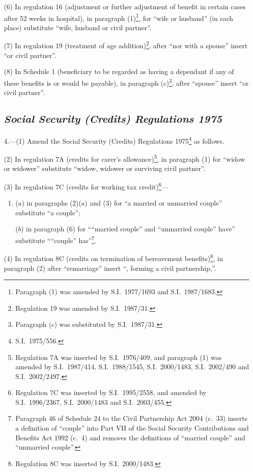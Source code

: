 \documentclass[12pt,a4paper]{article}
\begin{document}
(6) In regulation 16 (adjustment or further adjustment of benefit in certain cases after 52 weeks in hospital), in paragraph (1)\footnote{Paragraph (1) was amended by S.I.\ 1977/1693 and S.I.\ 1987/1683.}, for “wife or husband” (in each place) substitute “wife, husband or civil partner”.

(7) In regulation 19 (treatment of age addition)\footnote{Regulation 19 was amended by S.I.\ 1987/31.}, after “nor with a spouse” insert “or civil partner”.

(8) In Schedule 1 (beneficiary to be regarded as having a dependant if any of these benefits is or would be payable), in paragraph ($c$)\footnote{Paragraph ($c$) was substituted by S.I.\ 1987/31.}, after “spouse” insert “or civil partner”.

\subsection*{\itshape Social Security (Credits) Regulations 1975}

4.---(1)  Amend the Social Security (Credits) Regulations 1975\footnote{S.I.\ 1975/556.} as follows.

(2) In regulation 7A (credits for carer’s allowance)\footnote{Regulation 7A was inserted by S.I.\ 1976/409, and paragraph (1) was amended by S.I.\ 1987/414, S.I.\ 1988/1545, S.I.\ 2000/1483, S.I.\ 2002/490 and S.I.\ 2002/2497.}, in paragraph (1) for “widow or widower” substitute “widow, widower or surviving civil partner”.

(3) In regulation 7C (credits for working tax credit)\footnote{Regulation 7C was inserted by S.I.\ 1995/2558, and amended by S.I.\ 1996/2367, S.I.\ 2000/1483 and S.I.\ 2003/455.}—
\begin{enumerate}\item[]
($a$) in paragraphs (2)($a$)  and (3) for “a married or unmarried couple” substitute “a couple”;

($b$) in paragraph (6) for ““married couple” and “unmarried couple” have” substitute ““couple” has”\footnote{Paragraph 46 of Schedule 24 to the Civil Partnership Act 2004 (c.\ 33) inserts a definition of “couple” into Part VII of the Social Security Contributions and Benefits Act 1992 (c.\ 4) and removes the definitions of “married couple” and “unmarried couple”.}.
\end{enumerate}

(4) In regulation 8C (credits on termination of bereavement benefits)\footnote{Regulation 8C was inserted by S.I.\ 2000/1483.}, in paragraph (2) after “remarriage” insert “, forming a civil partnership,”.
\end{document}
